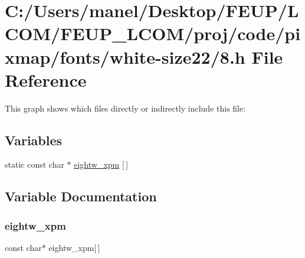 \hypertarget{white-size22_28_8h}{}\section{C\+:/\+Users/manel/\+Desktop/\+F\+E\+U\+P/\+L\+C\+O\+M/\+F\+E\+U\+P\+\_\+\+L\+C\+O\+M/proj/code/pixmap/fonts/white-\/size22/8.h File Reference}
\label{white-size22_28_8h}
This graph shows which files directly or indirectly include this file\+:
\subsection*{Variables}
\begin{DoxyCompactItemize}
\item 
static const char $\ast$ \mbox{\hyperlink{white-size22_28_8h_a28374bf9874ffbfb5c2214e82cf7b31d}{eightw\+\_\+xpm}} \mbox{[}$\,$\mbox{]}
\end{DoxyCompactItemize}


\subsection{Variable Documentation}
\mbox{\label{white-size22_28_8h_a28374bf9874ffbfb5c2214e82cf7b31d}} 
\subsubsection{\texorpdfstring{eightw\_xpm}{eightw\_xpm}}
{\footnotesize\ttfamily const char$\ast$ eightw\+\_\+xpm\mbox{[}$\,$\mbox{]}\hspace{0.3cm}{\ttfamily [static]}}

